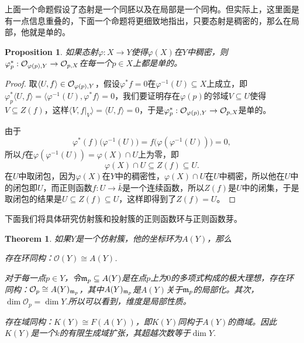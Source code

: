\documentclass[9pt]{extbook}
\theoremstyle{plain}%
\newtheorem{pro}[defi]{Proposition}%
\newtheorem{theo}[defi]{Theorem}%
\begin{document}
上面一个命题假设了态射是一个同胚以及在局部是一个同构。但实际上，这里面是有一点信息重叠的，下面一个命题将更细致地指出，只要态射是稠密的，那么在局部，他就是单的。
\begin{pro}
	如果态射$\varphi:X\to Y$使得$\varphi(X)$在$Y$中稠密，则$\varphi^*_p:\mathcal{O}_{\varphi(p),Y}\to \mathcal{O}_{p,X}$在每一个$p\in X$上都是单的。
	\label{c3:p4}
\end{pro}
\begin{proof}
	取$\langle U,f\rangle\in \mathcal{O}_{\varphi(p),Y}$，假设$\varphi^*f=0$在$\varphi^{-1}(U)\subseteq X$上成立，即$\varphi^*_p \langle U,f\rangle=\langle \varphi^{-1}(U),\varphi^*f\rangle=0$，我们要证明存在$\varphi(p)$的邻域$V\subseteq U$使得$V\subseteq Z(f)$，这样$\langle V,f|_V\rangle=\langle U,f\rangle=0$，于是$\varphi^*_p:\mathcal{O}_{\varphi(p),Y}\to \mathcal{O}_{p,X}$是单的。

	由于
	\[
		\varphi^*(f)\bigl(\varphi^{-1}(U)\bigr)=f\bigl(\varphi(\varphi^{-1}(U))\bigr)=0,
	\]
	所以$f$在$\varphi(\varphi^{-1}(U))=\varphi(X)\cap U$上为零，即
	\[
		\varphi(X)\cap U\subseteq Z(f)\subseteq U.
	\]
	在$U$中取闭包，因为$\varphi(X)$在$Y$中的稠密性，$\varphi(X)\cap U$在$U$中稠密，所以他在$U$中的闭包即$U$，而正则函数$f:U\to \bar{k}$是一个连续函数，所以$Z(f)$是$U$中的闭集，于是取闭包的结果是$U\subseteq Z(f) \subseteq U$，这样即得到了$Z(f)=U$。
\end{proof}
下面我们将具体研究仿射簇和投射簇的正则函数环与正则函数芽。
\begin{theo}
	如果$Y$是一个仿射簇，他的坐标环为$A(Y)$，那么

	 存在环同构：$\mathcal{O}(Y)\cong A(Y)$.

	 对于每一点$p\in Y$，令$\mathfrak{m}_p\subseteq A(Y)$是在点$p$上为$0$的多项式构成的极大理想，存在环同构：$\mathcal{O}_p\cong A(Y)_{\mathfrak{m}_p}$，其中$A(Y)_{\mathfrak{m}_p}$是$A(Y)$关于$\mathfrak{m}_p$的局部化。其次，$\dim \mathcal{O}_p=\dim Y$.所以可以看到，维度是局部性质。

	 存在域同构：$K(Y)\cong F(A(Y))$，即$K(Y)$同构于$A(Y)$的商域。因此$K(Y)$是一个$k$的有限生成域扩张，其超越次数等于$\dim Y$.
	\label{c3:t12}
\end{theo}
\end{document}
